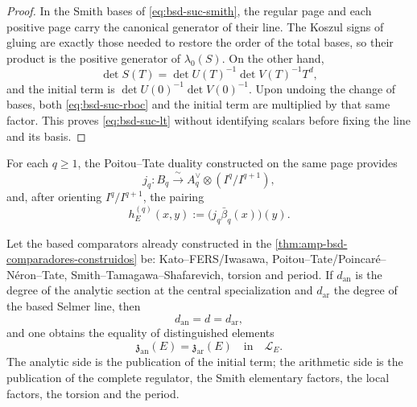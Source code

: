 \begin{proof}
In the Smith bases of \eqref{eq:bsd-suc-smith}, the regular page and each
positive page carry the canonical generator of their line. The Koszul
signs of gluing are exactly those needed to restore the order of
the total bases, so their product is the positive generator of
\(\lambda_0(S)\). On the other hand,
\[
 \det S(T)=\det U(T)^{-1}\det V(T)^{-1}T^d,
\]
and the initial term is
\(\det U(0)^{-1}\det V(0)^{-1}\). Upon undoing the change of bases, both
\eqref{eq:bsd-suc-rboc} and the initial term are multiplied by that same
factor. This proves \eqref{eq:bsd-suc-lt} without identifying scalars before
fixing the line and its basis.
\end{proof}

For each \(q\geq1\), the Poitou--Tate duality constructed on the same
page provides
\begin{equation}\label{eq:bsd-suc-jq}
 j_q:B_q\xrightarrow{\ \sim\ }
 A_q^{\vee}\otimes(I^q/I^{q+1}),
\end{equation}
and, after orienting \(I^q/I^{q+1}\), the pairing
\begin{equation}\label{eq:bsd-suc-altura-derivada}
 h_E^{(q)}(x,y)
 :=\bigl(j_q\bar\beta_q(x)\bigr)(y).
\end{equation}



\begin{theorem}
\label{thm:bsd-suc-local-global}
Let the based comparators already constructed in the
\cref{thm:amp-bsd-comparadores-construidos} be:
Kato--FERS/Iwasawa,
Poitou--Tate/Poincaré--Néron--Tate,
Smith--Tamagawa--Shafarevich, torsion and period.
If \(d_{\mathrm{an}}\) is the degree of the analytic section at the
central specialization and \(d_{\mathrm{ar}}\) the degree of the based Selmer
line, then
\begin{equation}\label{eq:bsd-suc-grados}
 d_{\mathrm{an}}=d=d_{\mathrm{ar}},
\end{equation}
and one obtains the equality of distinguished elements
\begin{equation}\label{eq:bsd-suc-linea-final}
 \mathfrak z_{\mathrm{an}}(E)=\mathfrak z_{\mathrm{ar}}(E)
 \quad\text{in}\quad\mathcal L_E.
\end{equation}
The analytic side is the publication of the initial term; the arithmetic
side is the publication of the complete regulator, the Smith
elementary factors,
the local factors, the torsion and the period.
\end{theorem}

